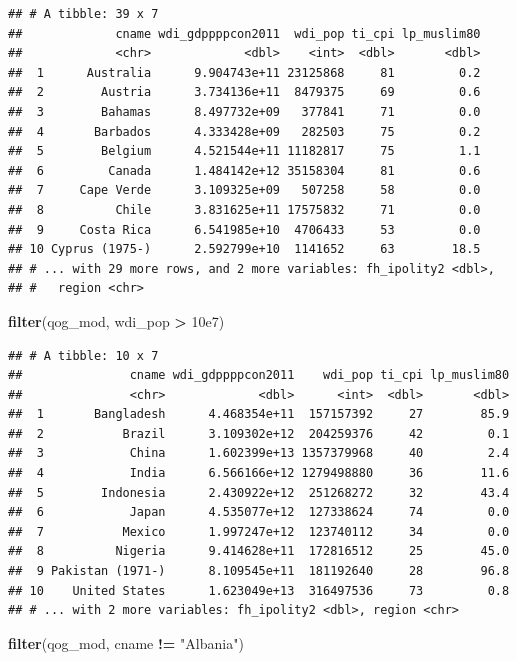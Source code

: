 \documentclass[]{book}
\newenvironment{Shaded}{\begin{snugshade}}{\end{snugshade}}
\newcommand{\KeywordTok}[1]{\textcolor[rgb]{0.13,0.29,0.53}{\textbf{#1}}}
\newcommand{\FloatTok}[1]{\textcolor[rgb]{0.00,0.00,0.81}{#1}}
\newcommand{\StringTok}[1]{\textcolor[rgb]{0.31,0.60,0.02}{#1}}
\newcommand{\OperatorTok}[1]{\textcolor[rgb]{0.81,0.36,0.00}{\textbf{#1}}}
\newcommand{\NormalTok}[1]{#1}
\begin{document}
\begin{verbatim}
## # A tibble: 39 x 7
##             cname wdi_gdppppcon2011  wdi_pop ti_cpi lp_muslim80
##             <chr>             <dbl>    <int>  <dbl>       <dbl>
##  1      Australia      9.904743e+11 23125868     81         0.2
##  2        Austria      3.734136e+11  8479375     69         0.6
##  3        Bahamas      8.497732e+09   377841     71         0.0
##  4       Barbados      4.333428e+09   282503     75         0.2
##  5        Belgium      4.521544e+11 11182817     75         1.1
##  6         Canada      1.484142e+12 35158304     81         0.6
##  7     Cape Verde      3.109325e+09   507258     58         0.0
##  8          Chile      3.831625e+11 17575832     71         0.0
##  9     Costa Rica      6.541985e+10  4706433     53         0.0
## 10 Cyprus (1975-)      2.592799e+10  1141652     63        18.5
## # ... with 29 more rows, and 2 more variables: fh_ipolity2 <dbl>,
## #   region <chr>
\end{verbatim}

\begin{Shaded}
\begin{Highlighting}[]
\KeywordTok{filter}\NormalTok{(qog_mod, wdi_pop }\OperatorTok{>}\StringTok{ }\FloatTok{10e7}\NormalTok{)}
\end{Highlighting}
\end{Shaded}

\begin{verbatim}
## # A tibble: 10 x 7
##               cname wdi_gdppppcon2011    wdi_pop ti_cpi lp_muslim80
##               <chr>             <dbl>      <int>  <dbl>       <dbl>
##  1       Bangladesh      4.468354e+11  157157392     27        85.9
##  2           Brazil      3.109302e+12  204259376     42         0.1
##  3            China      1.602399e+13 1357379968     40         2.4
##  4            India      6.566166e+12 1279498880     36        11.6
##  5        Indonesia      2.430922e+12  251268272     32        43.4
##  6            Japan      4.535077e+12  127338624     74         0.0
##  7           Mexico      1.997247e+12  123740112     34         0.0
##  8          Nigeria      9.414628e+11  172816512     25        45.0
##  9 Pakistan (1971-)      8.109545e+11  181192640     28        96.8
## 10    United States      1.623049e+13  316497536     73         0.8
## # ... with 2 more variables: fh_ipolity2 <dbl>, region <chr>
\end{verbatim}

\begin{Shaded}
\begin{Highlighting}[]
\KeywordTok{filter}\NormalTok{(qog_mod, cname }\OperatorTok{!=}\StringTok{ "Albania"}\NormalTok{)}
\end{Highlighting}
\end{Shaded}
\end{document}
